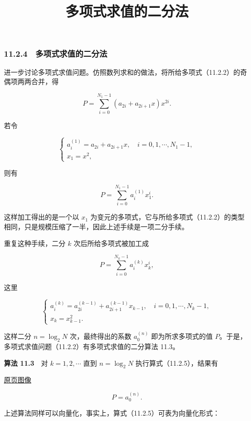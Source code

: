 \documentclass[
  10pt,
  fontset=fandol]{ctexart}
\title{多项式求值的二分法}
\author{}
\date{}
\begin{document}
\maketitle

\subsubsection{11.2.4　多项式求值的二分法}\label{ux591aux9879ux5f0fux6c42ux503cux7684ux4e8cux5206ux6cd5}

进一步讨论多项式求值问题。仿照数列求和的做法，将所给多项式（11.2.2）的奇偶项两两合并，得

\[
P=\sum_{i=0}^{N_1-1}(a_{2i}+a_{2i+1}x)x^{2i}.
\]

若令

\[
\begin{cases}
a_i^{(1)}=a_{2i}+a_{2i+1}x,\quad i=0,1,\cdots,N_1-1,\\
x_1=x^2,
\end{cases}
\]

则有

\[
P=\sum_{i=0}^{N_1-1}a_i^{(1)}x_1^i.
\]

这样加工得出的是一个以 \(x_1\) 为变元的多项式，它与所给多项式（11.2.2）的类型相同，只是规模压缩了一半，因此上述手续是一项二分手续。

重复这种手续，二分 \(k\) 次后所给多项式被加工成

\[
P=\sum_{i=0}^{N_k-1}a_i^{(k)}x_k^i,
\]

这里

\[
\begin{cases}
a_i^{(k)}=a_{2i}^{(k-1)}+a_{2i+1}^{(k-1)}x_{k-1},\quad i=0,1,\cdots,N_k-1,\\
x_k=x_{k-1}^2.
\end{cases}
\tag{11.2.5}
\]

这样二分 \(n=\log_2 N\) 次，最终得出的系数 \(a_0^{(n)}\) 即为所求多项式的值 \(P\)。于是，多项式求值问题（11.2.2）有多项式求值的二分算法 11.3。

\textbf{算法 11.3}　对 \(k=1,2,\cdots\) 直到 \(n=\log_2 N\) 执行算式（11.2.5），结果有

\href{../../source-images/pdf-283.jpeg}{原页图像}

\[
P=a_0^{(n)}.
\]

上述算法同样可以向量化，事实上，算式（11.2.5）可表为向量化形式：
\end{document}
